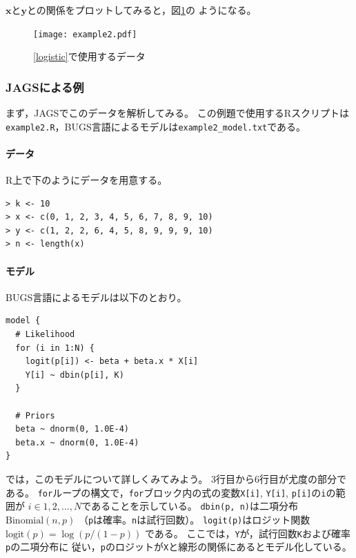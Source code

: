 \documentclass[11pt,uplatex]{jsarticle}
\begin{document}
$\bm{x}$と$\bm{y}$との関係をプロットしてみると，図\ref{example2_plot}の
ようになる。

\begin{figure}[htbp]
  \begin{center}
    \texttt{[image: example2.pdf]}
  \end{center}
  \caption{\ref{logistic}で使用するデータ}
  \label{example2_plot}
\end{figure}

\subsubsection{JAGSによる例}

まず，\textsf{JAGS}でこのデータを解析してみる。
この例題で使用する\textsf{R}スクリプトは\texttt{example2.R}，\textsf{BUGS}言語によるモデルは\texttt{example2\_model.txt}である。

\paragraph{データ}
\textsf{R}上で下のようにデータを用意する。
\begin{lstlisting}
> k <- 10
> x <- c(0, 1, 2, 3, 4, 5, 6, 7, 8, 9, 10)
> y <- c(1, 2, 2, 6, 4, 5, 8, 9, 9, 9, 10)
> n <- length(x)
\end{lstlisting}


\paragraph{モデル}
BUGS言語によるモデルは以下のとおり。

\begin{lstlisting}
model {
  # Likelihood
  for (i in 1:N) {
    logit(p[i]) <- beta + beta.x * X[i]
    Y[i] ~ dbin(p[i], K)
  }

  # Priors
  beta ~ dnorm(0, 1.0E-4)
  beta.x ~ dnorm(0, 1.0E-4)
}
\end{lstlisting}

では，このモデルについて詳しくみてみよう。
3行目から6行目が尤度の部分である。
\texttt{for}ループの構文で，\texttt{for}ブロック内の式の変数\texttt{X[i]}, \texttt{Y[i]}, 
\texttt{p[i]}の\texttt{i}の範囲が
$i \in 1, 2, \dots, N$であることを示している。
\texttt{dbin(p, n)}は二項分布$\mathrm{Binomial}(n, p)$
（\texttt{p}は確率。\texttt{n}は試行回数）。
\texttt{logit(p)}はロジット関数
$\mathrm{logit}(p) = \log(p/(1-p))$
である。
ここでは，\texttt{Y}が，試行回数\texttt{K}および確率\texttt{p}の二項分布に
従い，\texttt{p}のロジットが\texttt{X}と線形の関係にあるとモデル化している。
\end{document}
